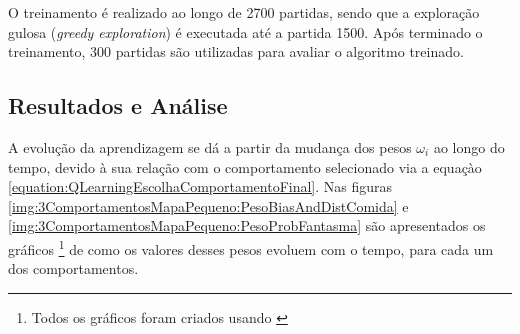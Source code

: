O treinamento é realizado ao longo de 2700 partidas, sendo que a exploração gulosa (\textit{greedy exploration}) é executada até a partida 1500. Após terminado o treinamento, 300 partidas são utilizadas para avaliar o algoritmo treinado.


\subsection{Resultados e Análise}

A evolução da aprendizagem se dá a partir da mudança dos pesos $ \omega_i $ ao longo do tempo, devido à sua relação com o comportamento selecionado via a equaçào \ref{equation:QLearningEscolhaComportamentoFinal}. Nas figuras \ref{img:3ComportamentosMapaPequeno:PesoBiasAndDistComida} e \ref{img:3ComportamentosMapaPequeno:PesoProbFantasma} são apresentados os gráficos%
\footnote{Todos os gráficos foram criados usando \cite{Hunter:2007}%
} de como os valores desses pesos evoluem com o tempo, para cada um dos comportamentos.

